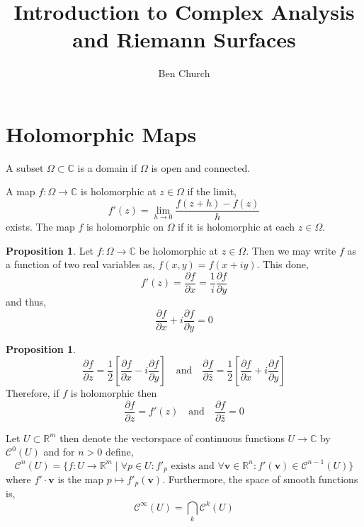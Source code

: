 \documentclass[12pt]{extarticle}
\newcommand{\R}{\mathbb{R}}
\newcommand{\C}{\mathbb{C}}
\newcommand{\pderiv}[2]{\frac{\partial{#1}}{\partial{#2}}}
\theoremstyle{definition}
\newtheorem{proposition}[theorem]{Proposition}
\newenvironment{definition}[1][Definition:]{\begin{trivlist}
\item[\hskip \labelsep {\bfseries #1}]}{\end{trivlist}}
\renewcommand{\bf}[1]{\mathbf{#1}}
\newcommand{\Class}[2]{\mathcal{C}^{#1} \left( #2 \right)}
\begin{document}
\title{Introduction to Complex Analysis and Riemann Surfaces}
\author{Ben Church}
\maketitle
\tableofcontents
\newpage

\section{Holomorphic Maps}

\begin{definition}
A subset $\Omega \subset \C$ is a domain if $\Omega$ is open and connected.
\end{definition}

\begin{definition}
A map $f : \Omega \to \C$ is holomorphic at $z \in \Omega$ if the limit,
\[ f'(z) = \lim_{h \to 0} \frac{ f(z + h) - f(z) }{h} \]
exists. The map $f$ is holomorphic on $\Omega$ if it is holomorphic at each $z \in \Omega$. 
\end{definition}

\begin{proposition}
Let $f : \Omega \to \C$ be holomorphic at $z \in \Omega$. Then we may write $f$ as a function of two real variables as, $f(x, y) = f(x + i y)$. This done,
\[ f'(z) = \pderiv{f}{x} = \frac{1}{i} \pderiv{f}{y} \]
and thus,
\[ \pderiv{f}{x} + i \pderiv{f}{y} = 0 \] 
\end{proposition}


\begin{proposition}
\[ \pderiv{f}{z} = \frac{1}{2} \left[ \pderiv{f}{x} - i \pderiv{f}{y} \right] \quad \text{and} \quad \pderiv{f}{\bar{z}} = \frac{1}{2} \left[ \pderiv{f}{x} + i \pderiv{f}{y} \right] \]
Therefore, if $f$ is holomorphic then 
\[ \pderiv{f}{z} = f'(z) \quad \text{and} \quad \pderiv{f}{\bar{z}} = 0 \]
\end{proposition}


\begin{definition}
Let $U \subset \R^m$ then denote the vectorspace of continuous functions $U \to \C$ by $\Class{0}{U}$ and for $n > 0$ define, 
\[ \Class{n}{U} = \{ f : U \to \R^m \mid \forall p \in U : f'_p \text{ exists and } \forall \bf{v} \in \R^n : f'(\bf{v}) \in \Class{n-1}{U} \} \] 
where $f' \cdot \bf{v}$ is the map $p \mapsto f'_p(\bf{v})$. Furthermore, the space of smooth functions is,
\[ \Class{\infty}{U} = \bigcap_{k} \Class{k}{U} \] 
\end{definition}
\end{document}
